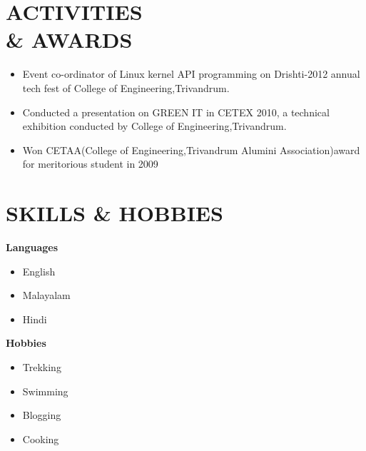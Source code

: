 \documentclass[line,margin]{res}
\begin{document}
\begin{resume}
    \section{ACTIVITIES \\ \& AWARDS}
		\begin{itemize}[leftmargin=*] \itemsep -1pt 
			\item Event co-ordinator of Linux kernel API programming on Drishti-2012 annual tech fest of College of Engineering,Trivandrum.
		 	\item Conducted a presentation on GREEN IT in CETEX 2010, a technical exhibition conducted by College of Engineering,Trivandrum.
		 	\item Won CETAA(College of Engineering,Trivandrum Alumini Association)award for meritorious student in 2009
		\end{itemize}
	\section{SKILLS \& HOBBIES}
	    {\bf Languages}
	    \begin{itemize}[leftmargin=*] \itemsep -2pt
	    	\item English
	        \item Malayalam
		  	\item Hindi
	    \end{itemize}
	    {\bf Hobbies}
	    \begin{itemize}[leftmargin=*] \itemsep -2pt
	        \item Trekking
	        \item Swimming
		  	\item Blogging
			\item Cooking
	    \end{itemize} 

\end{resume}
\end{document}
